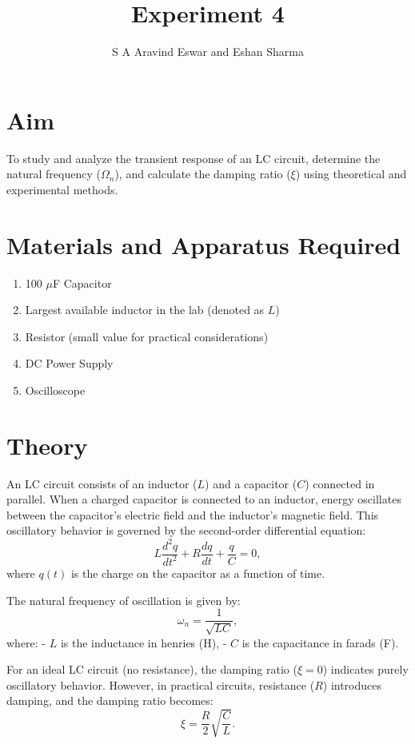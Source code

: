 \documentclass[journal]{IEEEtran}
\begin{document}

\vspace{3cm}

\title{Experiment 4} 
\author{S A Aravind Eswar and Eshan Sharma}
{\let\newpage\relax\maketitle}

\section{Aim}

To study and analyze the transient response of an LC circuit, determine the natural frequency (\(\Omega_n\)), and calculate the damping ratio (\(\xi\)) using theoretical and experimental methods.

\section{Materials and Apparatus Required}

\begin{enumerate}
	\item 100 $\mu$F Capacitor
	\item Largest available inductor in the lab (denoted as \(L\))
	\item Resistor (small value for practical considerations)
	\item DC Power Supply
	\item Oscilloscope
\end{enumerate}

\section{Theory}

An LC circuit consists of an inductor (\(L\)) and a capacitor (\(C\)) connected in parallel. When a charged capacitor is connected to an inductor, energy oscillates between the capacitor's electric field and the inductor's magnetic field. This oscillatory behavior is governed by the second-order differential equation:
\[
L \frac{d^2q}{dt^2} + R \frac{dq}{dt}+\frac{q}{C} = 0,
\]
where \(q(t)\) is the charge on the capacitor as a function of time.

The natural frequency of oscillation is given by:
\[
\omega_n = \frac{1}{\sqrt{LC}},
\]
where:
- \(L\) is the inductance in henries (H),
- \(C\) is the capacitance in farads (F).

For an ideal LC circuit (no resistance), the damping ratio (\(\xi = 0\)) indicates purely oscillatory behavior. However, in practical circuits, resistance (\(R\)) introduces damping, and the damping ratio becomes:
\[
\xi = \frac{R}{2} \sqrt{\frac{C}{L}}.
\]
\end{document}
